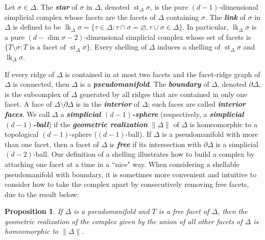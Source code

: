 \documentclass[11pt,twoside]{article}
\newtheorem{proposition}[theorem]{Proposition}
\theoremstyle{definition}
\let\emptyset\varnothing
\DeclareMathOperator{\st}{st}
\DeclareMathOperator{\lk}{lk}
\begin{document}
Let $\sigma \in \Delta$. The \textbf{\emph{star}} of $\sigma$ in $\Delta$, denoted $\st_\Delta \sigma$, is the pure $(d-1)$-dimensional simplicial complex whose facets are the facets of $\Delta$ containing $\sigma$. The \textbf{\emph{link}} of $\sigma$ in $\Delta$ is defined to be $\lk_\Delta \sigma = \{\tau \in \Delta: \tau \cap \sigma = \emptyset, \tau \cup \sigma \in \Delta\}$. In particular, $\lk_\Delta \sigma$ is a pure $(d-\dim \sigma-2)$-dimensional simplicial complex whose set of facets is $\{T \setminus \sigma: T \text{ is a facet of } \st_\Delta \sigma\}$. Every shelling of $\Delta$ induces a shelling of $\st_\Delta \sigma$ and $\lk_\Delta \sigma$.

If every ridge of $\Delta$ is contained in at most two facets and the facet-ridge graph of $\Delta$ is connected, then $\Delta$ is a \textbf{\emph{pseudomanifold}}. The \textbf{\emph{boundary}} of $\Delta$, denoted $\partial \Delta$, is the subcomplex of $\Delta$ generated by all ridges that are contained in only one facet. A face of $\Delta \setminus \partial \Delta$ is in the \textbf{\emph{interior}} of $\Delta$; such faces are called \textbf{\emph{interior faces}}. We call $\Delta$ a \textbf{\emph{simplicial $(d-1)$-sphere}} (respectively, a \textbf{\emph{simplicial $(d-1)$-ball}}) if the \textbf{\emph{geometric realization}} $\lVert \Delta \rVert$ of $\Delta$ is homeomorphic to a topological $(d-1)$-sphere ($(d-1)$-ball). If $\Delta$ is a pseudomanifold with more than one facet, then a facet of $\Delta$ is \textbf{\emph{free}} if its intersection with $\partial \Delta$ is a simplicial $(d-2)$-ball. Our definition of a shelling illustrates how to build a complex by attaching one facet at a time in a ``nice" way. When considering a shellable pseudomanifold with boundary, it is sometimes more convenient and intuitive to consider how to take the complex apart by consecutively removing free facets, due to the result below:
\begin{proposition}\label{prop:freefacet}{\rm \cite[Proposition 2.4(iii)]{Zieglernonshell}} If $\Delta$ is a pseudomanifold and $T$ is a free facet of $\Delta$, then the geometric realization of the complex given by the union of all other facets of $\Delta$ is homeomorphic to $\lVert \Delta \rVert$.
\end{proposition}
\end{document}
